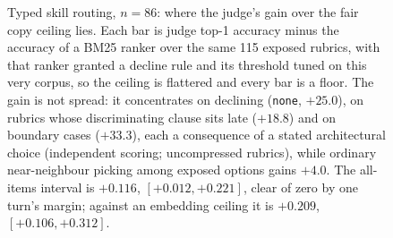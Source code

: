 \begin{figure}[t]\centering
{}
\caption{Typed skill routing, $n=86$: where the judge's gain over the fair copy ceiling lies.
Each bar is judge top-1 accuracy minus the accuracy of a BM25 ranker over the same 115 exposed
rubrics, with that ranker granted a decline rule and its threshold tuned on this very corpus, so the
ceiling is flattered and every bar is a floor. The gain is not spread: it concentrates on declining
(\texttt{none}, $+25.0$), on rubrics whose discriminating clause sits late ($+18.8$) and on boundary
cases ($+33.3$), each a consequence of a stated architectural choice (independent scoring; uncompressed
rubrics), while ordinary near-neighbour picking among exposed options gains $+4.0$. The all-items interval is $+0.116$,
$[+0.012,+0.221]$, clear of zero by one turn's margin; against an embedding ceiling it is $+0.209$,
$[+0.106,+0.312]$.}
\label{fig:routing}
\end{figure}
